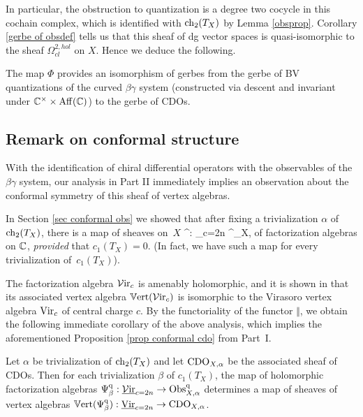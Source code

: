 In particular, the obstruction to quantization is a degree two cocycle in this cochain complex, 
which is identified with ${\rm ch}_2(T_X)$ by Lemma \ref{obsprop}.
Corollary \ref{gerbe of obsdef} tells us that this sheaf of dg vector spaces is quasi-isomorphic to the sheaf $\Omega^{2,hol}_{cl}$ on $X$. Hence we deduce the following.

\begin{cor}
The map $\Phi$ provides an isomorphism of gerbes from the gerbe of BV quantizations of the curved $\beta\gamma$ system (constructed via descent and invariant under $\mathbb C^\times \times {\rm Aff}(\mathbb C)$) to the gerbe of CDOs.
\end{cor}

\subsection{Remark on conformal structure}

With the identification of chiral differential operators with the observables of the $\beta\gamma$ system, 
our analysis in Part II immediately implies an observation about the conformal symmetry of this sheaf of vertex algebras. 

In Section \ref{sec conformal obs} we showed that after fixing a trivialization $\alpha$ of ${\rm ch}_2(T_X)$, 
there is a map of sheaves on~$X$ 
\ben
\Psi^\q : \ul{\sVir}_{c=2n} \to \Obs^\q_{X, \alpha}
\een 
of factorization algebras on $\mathbb C$, {\em provided} that $c_1(T_X) = 0$. (In fact, we have such a map for every trivialization of~$c_1(T_X)$). 

The factorization algebra $\mathcal{V}{\rm ir}_{c}$ is amenably holomorphic, and it is shown in \cite{bw_vir} that its associated vertex algebra $\mathbb{V}{\rm ert}(\mathcal{V}{\rm ir}_{c})$ is isomorphic to the Virasoro vertex algebra ${\rm Vir}_c$ of central charge $c$. 
By the functoriality of the functor $\Vert$, 
we obtain the following immediate corollary of the above analysis, which implies the aforementioned Proposition \ref{prop conformal cdo} from Part~I. 

\begin{cor} 
Let $\alpha$ be trivialization of ${\rm ch}_2(T_X)$ and let ${\rm CDO}_{X,\alpha}$ be the associated sheaf of CDOs. 
Then for each trivialization $\beta$ of $c_1(T_X)$, 
the map of holomorphic factorization algebras $\Psi^{\rm q}_\beta : \underline{\mathcal{V}{\rm ir}}_{c=2n} \to {\rm Obs}^{\rm q}_{X,\alpha}$ determines a map of sheaves of vertex algebras $\mathbb{V}{\rm ert}(\Psi^{\rm q}_\beta) : \underline{\rm Vir}_{c=2n} \to {\rm CDO}_{X,\alpha}$.
\end{cor}

